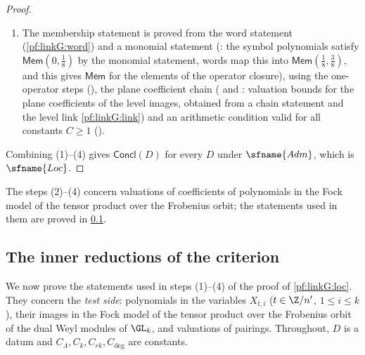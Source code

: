 \begin{proof}
\begin{enumerate}[label=(\arabic*)]
\item The membership statement is proved from the word statement (\cref{pf:linkG:word}) and a monomial statement
(: the symbol polynomials satisfy
$\mathsf{Mem}(0,\frac18)$ by the monomial statement, words map this into $\mathsf{Mem}(\frac18,\frac38)$, and this gives $\mathsf{Mem}$
for the elements of the operator closure), using the one-operator
steps (), the plane coefficient chain
( and :
valuation bounds for the plane coefficients of the level images, obtained from a chain statement and the level link
\cref{pf:linkG:link}) and an arithmetic condition valid for all constants $C\ge1$
().
\end{enumerate}
Combining (1)--(4) gives $\mathsf{Concl}(D)$ for every $D$ under $\sfname{Adm}$, which is $\sfname{Loc}$.
\end{proof}

The steps (2)--(4) concern valuations of coefficients of polynomials in the Fock model of the tensor product over the
Frobenius orbit; the statements used in them are proved in \cref{sec:pf:linkG:inner}.

\subsection{The inner reductions of the criterion}\label{sec:pf:linkG:inner}

We now prove the statements used in steps (1)--(4) of the proof of \cref{pf:linkG:loc}. They concern the \emph{test
side}: polynomials in the variables $X_{t,i}$ ($t\in\Z/n'$, $1\le i\le k$), their images in the Fock model of the tensor
product over the Frobenius orbit of the dual Weyl modules of $\GL_k$, and valuations of pairings. Throughout, $D$ is a datum
and $C_\Lambda,C_k,C_{rk},C_{\deg}$ are constants.

